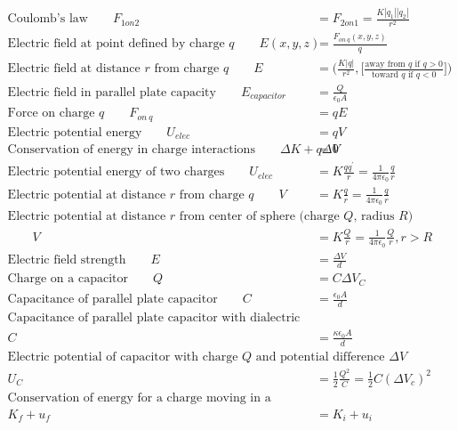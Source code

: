 \documentclass[]{article}
\begin{document}
\begin{align*}
	\text{Coulomb's law} \qquad F_{1 on 2} &= F_{2 on 1} = \frac{K \left| q_1 \right| \left| q_2 \right| }{r^2} \\
	\text{Electric field at point defined by charge $q$} \qquad E(x,y,z) &= \frac{F_{on\ q}(x,y,z)}{q} \\
	\text{Electric field at distance $r$ from charge $q$} \qquad E &= \Big( \frac{K \lvert q \rvert}{r^2}, \Bigg[ \frac{\text{away from $q$ if $q > 0$}}{\text{toward $q$ if $q < 0$}} \Bigg]  \Big) \\
	\text{Electric field in parallel plate capacity} \qquad E_{capacitor} &= \frac{Q}{\epsilon_0 A} \\
	\text{Force on charge $q$} \qquad F_{on\ q} &= q E \\
	\text{Electric potential energy} \qquad U_{elec} &= q V \\
	\text{Conservation of energy in charge interactions}  \qquad \Delta K + q \Delta V &= 0 \\
	\text{Electric potential energy of two charges}  \qquad U_{elec} &= K \frac{q q^{'}}{r} = \frac{1}{4 \pi \epsilon_0} \frac{q}{r} \\
	\text{Electric potential at distance $r$ from charge $q$}  \qquad	V &= K \frac{q}{r} = \frac{1}{4 \pi \epsilon_0} \frac{q}{r} \\
	\text{Electric potential at distance $r$ from center of sphere (charge $Q$, radius $R$)} \\
	\qquad V &= K \frac{Q}{r} = \frac{1}{4 \pi \epsilon_0} \frac{Q}{r}, r > R \\
	\text{Electric field strength} \qquad E &= \frac{\Delta V}{d} \\
	\text{Charge on a capacitor}  \qquad Q &= C \Delta V_C \\
	\text{Capacitance of parallel plate capacitor} \qquad C &= \frac{\epsilon_0 A}{d} \\
	\text{Capacitance of parallel plate capacitor with dialectric} \\
	 C &= \frac{\kappa \epsilon_0 A}{d} \\
	\text{Electric potential of capacitor with charge $Q$ and potential difference $\Delta V$} \\
	 U_C &= \frac{1}{2} \frac{Q^2}{C} = \frac{1}{2} C ( \Delta V_c)^2 \\
	\text{Conservation of energy for a charge moving in a potential field} \\
	 K_f + u_f &= K_i + u_i \\
\end{align*}
\end{document}
